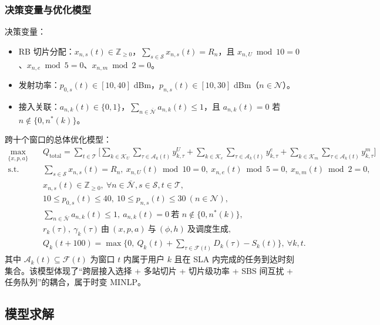 \subsubsection{决策变量与优化模型}

决策变量：
\begin{itemize}
  \item RB 切片分配：$x_{n,s}(t)\in\mathbb{Z}_{\ge 0}$，$\sum\limits_{s\in\mathcal{S}} x_{n,s}(t)=R_n$，且 $x_{n,U}\bmod 10=0$、$x_{n,e}\bmod 5=0$、$x_{n,m}\bmod 2=0$。
  \item 发射功率：$p_{0,s}(t)\in[10,40]$ dBm，$p_{n,s}(t)\in[10,30]$ dBm（$n\in\mathcal{N}$）。
  \item 接入关联：$a_{n,k}(t)\in\{0,1\}$，$\sum\limits_{n\in\bar{\mathcal{N}}} a_{n,k}(t)\le 1$，且 $a_{n,k}(t)=0$ 若 $n\notin\{0,n^*(k)\}$。
\end{itemize}

跨十个窗口的总体优化模型：
\begin{equation}
\begin{aligned}
\max\limits_{\{x,p,a\}}\quad & Q_{\text{total}}=\sum_{t\in\mathcal{T}}\Bigg[\sum_{k\in\mathcal{K}_U}\sum_{\tau\in\mathcal{A}_k(t)} y^{U}_{k,\tau}+\sum_{k\in\mathcal{K}_e}\sum_{\tau\in\mathcal{A}_k(t)} y^{e}_{k,\tau}+\sum_{k\in\mathcal{K}_m}\sum_{\tau\in\mathcal{A}_k(t)} y^{m}_{k,\tau}\Bigg] \\
\text{s.t.}\quad & \sum_{s\in\mathcal{S}} x_{n,s}(t)=R_n,\ x_{n,U}(t)\bmod 10=0,\ x_{n,e}(t)\bmod 5=0,\ x_{n,m}(t)\bmod 2=0,\\
& x_{n,s}(t)\in\mathbb{Z}_{\ge 0},\ \forall n\in\bar{\mathcal{N}},s\in\mathcal{S},t\in\mathcal{T},\\
& 10\le p_{0,s}(t)\le 40,\ 10\le p_{n,s}(t)\le 30\ (n\in\mathcal{N}),\\
& \sum_{n\in\bar{\mathcal{N}}} a_{n,k}(t)\le 1,\ a_{n,k}(t)=0\ \text{若 }n\notin\{0,n^*(k)\},\\
& r_k(\tau),\ \gamma_k(\tau)\ \text{由}\ (x,p,a)\ \text{与}\ (\phi,h)\ \text{及调度生成},\\
& Q_k(t+100)=\max\Big\{0,\ Q_k(t)+\sum_{\tau\in\mathcal{F}(t)} D_k(\tau)-S_k(t)\Big\},\ \forall k,t.
\end{aligned}
\end{equation}
其中 $\mathcal{A}_k(t)\subseteq\mathcal{F}(t)$ 为窗口 $t$ 内属于用户 $k$ 且在 SLA 内完成的任务到达时刻集合。该模型体现了“跨层接入选择 + 多站切片 + 切片级功率 + SBS 间互扰 + 任务队列”的耦合，属于时变 MINLP。

\subsection{模型求解}

